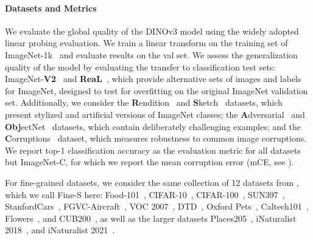 \paragraph{Datasets and Metrics}
We evaluate the global quality of the DINOv3 model using the widely adopted linear probing evaluation. 
We train a linear transform on the training set of ImageNet-1k~\citep{deng2009imagenet} and evaluate results on the val set.
We assess the generalization quality of the model by evaluating the transfer to classification test sets: ImageNet-\textbf{V2}~\citep{recht2019imagenet} and \textbf{ReaL}~\citep{beyer2020imagenetreal}, which provide alternative sets of images and labels for ImageNet, designed to test for overfitting on the original ImageNet validation set. Additionally, we consider the \textbf{R}endition~\citep{hendrycks2021many} and \textbf{S}ketch~\citep{wang2019learning} datasets, which present stylized and artificial versions of ImageNet classes; the \textbf{A}dversarial~\citep{hendrycks2021natural} and \textbf{Obj}ectNet~\citep{barbu2019objectnet} datasets, which contain deliberately challenging examples; and the \textbf{C}orruptions~\citep{hendrycks2019benchmarking} dataset, which measures robustness to common image corruptions. 
We report top-1 classification accuracy as the evaluation metric for all datasets but ImageNet-C, for which we report the mean corruption error (mCE, see \citep{hendrycks2019benchmarking}).

For fine-grained datasets, we consider the same collection of 12 datasets from \citet{oquab2024dinov2}, which we call Fine-S here: Food-101~\citep{dataset-food101}, CIFAR-10~\citep{krizhevsky2009learning}, CIFAR-100~\citep{krizhevsky2009learning}, SUN397~\citep{dataset-sun397}, StanfordCars~\citep{dataset-stanfordcars}, FGVC-Aircraft~\citep{dataset-aircraft}, VOC 2007~\citep{pascal-voc-2007}, DTD~\citep{dataset-dtd}, Oxford Pets~\citep{dataset-pets}, Caltech101~\citep{dataset-caltech101}, Flowers~\citep{dataset-flowers}, and CUB200~\citep{dataset-cub}, as well as the larger datasets Places205~\citep{zhou2014learning}, iNaturalist 2018~\citep{van2018inaturalist}, and iNaturalist 2021~\citep{van2021benchmarking}.

